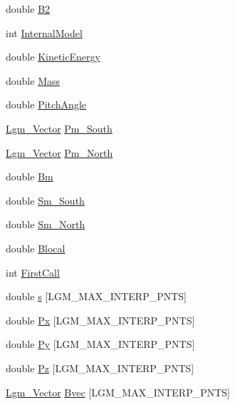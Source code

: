 \begin{CompactItemize}
\item 
double \hyperlink{struct_lgm___mag_model_info_c25028524f0b3bb1e35a6f5b62bc4f47}{B2}
\item 
int \hyperlink{struct_lgm___mag_model_info_02a6418c4d27275421dd73a5bbb65f8c}{InternalModel}
\item 
double \hyperlink{struct_lgm___mag_model_info_869c8a1c2af0f48c6e871b08c13d2852}{KineticEnergy}
\item 
double \hyperlink{struct_lgm___mag_model_info_c33418187547ea28dda7063924f34df6}{Mass}
\item 
double \hyperlink{struct_lgm___mag_model_info_86da8321817d74036d3ff23e8643dc68}{PitchAngle}
\item 
\hyperlink{struct_lgm___vector}{Lgm\_\-Vector} \hyperlink{struct_lgm___mag_model_info_a6b4371f4272ea673b10df3806973a78}{Pm\_\-South}
\item 
\hyperlink{struct_lgm___vector}{Lgm\_\-Vector} \hyperlink{struct_lgm___mag_model_info_680815020ea7ef4edf84c04a0d7f1f20}{Pm\_\-North}
\item 
double \hyperlink{struct_lgm___mag_model_info_8e90af044e680fe06a5f4745ead8b8d7}{Bm}
\item 
double \hyperlink{struct_lgm___mag_model_info_91d445e45d4679505b1a9b5b7cde690c}{Sm\_\-South}
\item 
double \hyperlink{struct_lgm___mag_model_info_e133118dcb4b4b581ae49086e9d16be3}{Sm\_\-North}
\item 
double \hyperlink{struct_lgm___mag_model_info_3c9886361e1ccd93a330528121ebe6d3}{Blocal}
\item 
int \hyperlink{struct_lgm___mag_model_info_52587930b11ea1eb053f0306dbc7973e}{FirstCall}
\item 
double \hyperlink{struct_lgm___mag_model_info_cf41bfa63c25a6466792c68b7b483bed}{s} \mbox{[}LGM\_\-MAX\_\-INTERP\_\-PNTS\mbox{]}
\item 
double \hyperlink{struct_lgm___mag_model_info_dd03b0d5df37a9e1074dec8d2b370a2d}{Px} \mbox{[}LGM\_\-MAX\_\-INTERP\_\-PNTS\mbox{]}
\item 
double \hyperlink{struct_lgm___mag_model_info_8a91bcce4c333afd8126b6a186dd59d7}{Py} \mbox{[}LGM\_\-MAX\_\-INTERP\_\-PNTS\mbox{]}
\item 
double \hyperlink{struct_lgm___mag_model_info_042f2ba75b091726dca685c45f9be927}{Pz} \mbox{[}LGM\_\-MAX\_\-INTERP\_\-PNTS\mbox{]}
\item 
\hyperlink{struct_lgm___vector}{Lgm\_\-Vector} \hyperlink{struct_lgm___mag_model_info_ee6c1c35a439c2b6b3d968446dffb31a}{Bvec} \mbox{[}LGM\_\-MAX\_\-INTERP\_\-PNTS\mbox{]}

\end{CompactItemize}
